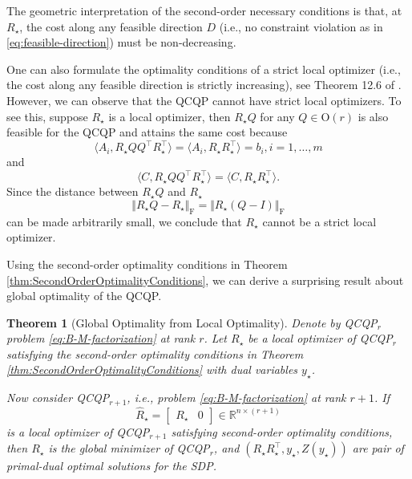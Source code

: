 \documentclass[
]{book}
\newtheorem{theorem}{Theorem}[chapter]
\theoremstyle{definition}
\theoremstyle{definition}
\theoremstyle{definition}
\theoremstyle{definition}
\theoremstyle{remark}
\begin{document}
The geometric interpretation of the second-order necessary conditions is that, at \(R_\star\), the cost along any feasible direction \(D\) (i.e., no constraint violation as in \eqref{eq:feasible-direction}) must be non-decreasing.

One can also formulate the optimality conditions of a strict local optimizer (i.e., the cost along any feasible direction is strictly increasing), see Theorem 12.6 of \citep{nocedal99book-numerical}. However, we can observe that the QCQP cannot have strict local optimizers. To see this, suppose \(R_\star\) is a local optimizer, then \(R_\star Q\) for any \(Q \in \mathrm{O}(r)\) is also feasible for the QCQP and attains the same cost because
\[
\langle A_i, R_\star Q Q^\top R_\star^\top \rangle = \langle A_i, R_\star R_\star^\top \rangle = b_i, i=1,\dots,m
\]
and
\[
\langle C, R_\star Q Q^\top R_\star^\top \rangle = \langle C, R_\star R_\star^\top \rangle.
\]
Since the distance between \(R_\star Q\) and \(R_\star\)
\[
\Vert R_\star Q - R_\star \Vert_\mathrm{F} = \Vert R_\star(Q - I) \Vert_\mathrm{F}
\]
can be made arbitrarily small, we conclude that \(R_\star\) cannot be a strict local optimizer.

Using the second-order optimality conditions in Theorem \ref{thm:SecondOrderOptimalityConditions}, we can derive a surprising result about global optimality of the QCQP.

\begin{theorem}[Global Optimality from Local Optimality]
\protect\hypertarget{thm:GlobalOptimalityFromLocalOptimality}{}\label{thm:GlobalOptimalityFromLocalOptimality}Denote by QCQP\(_r\) problem \eqref{eq:B-M-factorization} at rank \(r\). Let \(R_\star\) be a local optimizer of QCQP\(_r\) satisfying the second-order optimality conditions in Theorem \ref{thm:SecondOrderOptimalityConditions} with dual variables \(y_\star\).

Now consider QCQP\(_{r+1}\), i.e., problem \eqref{eq:B-M-factorization} at rank \(r+1\). If
\[
\hat{R}_\star = \begin{bmatrix}
R_\star & 0
\end{bmatrix} \in \mathbb{R}^{n \times (r+1)}
\]
is a local optimizer of QCQP\(_{r+1}\) satisfying second-order optimality conditions, then \(R_\star\) is the global minimizer of QCQP\(_r\), and \((R_\star R_\star^\top, y_\star, Z(y_\star))\) are pair of primal-dual optimal solutions for the SDP.
\end{theorem}
\end{document}
